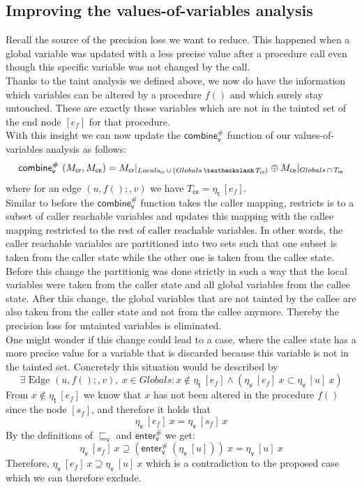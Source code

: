     \subsection{Improving the values-of-variables analysis}
    Recall the source of the precision loss we want to reduce. This happened when a global variable was updated with a less precise value after a procedure call even though this specific variable was not changed by the call.\\
    Thanks to the taint analysis we defined above, we now do have the information which variables can be altered by a procedure $f()$ and which surely stay untouched. These are exactly those variables which are not in the tainted set of the end node $[e_f]$ for that procedure.\\
    With this insight we can now update the $\textsf{combine}^{\#}_\textsf{v}$ function of our values-of-variables analysis as follows:
    \[
      \textsf{combine}^{\#}_\textsf{v}\ (M_\textsf{cr}, M_\textsf{ce}) = M_\textsf{cr}|_{Locals_\textsf{cr}\, \cup\, (Globals\, \textbackslash\, T_\textsf{ce})} \oplus M_\textsf{ce}|_{Globals\, \cap\, T_\textsf{ce}}
    \]
    where for an edge $(u, f();, v)$ we have $T_\textsf{ce} = \eta_\textsf{t}\ [e_f]$.\\
    Similar to before the $\textsf{combine}^{\#}_\textsf{v}$ function takes the caller mapping, restricts is to a subset of caller reachable variables and updates this mapping with the callee mapping restricted to the rest of caller reachable variables. In other words, the caller reachable variables are partitioned into two sets such that one subset is taken from the caller state while the other one is taken from the callee state. Before this change the partitionig was done strictly in such a way that the local variables were taken from the caller state and all global variables from the callee state. After this change, the global variables that are not tainted by the callee are also taken from the caller state and not from the callee anymore. Thereby the precision loss for untainted variables is eliminated.
    \\
    One might wonder if this change could lead to a case, where the callee state has a more precise value for a variable that is discarded because this variable is not in the tainted set. Concretely this situation would be described by 
    \[\exists \text{ Edge }(u, f();, v),\ x \in Globals: x \notin \eta_\textsf{t}\ [e_f] \land (\eta_\textsf{v}\ [e_f]\ x\subset \eta_\textsf{v}\ [u]\ x)\]
    From $x \notin \eta_\textsf{t}\ [e_f]$ we know that $x$ has not been altered in the procedure $f()$ since the node $[s_f]$, and therefore it holds that 
    \[\eta_\textsf{v}\ [e_f]\ x = \eta_\textsf{v}\ [s_f]\ x\]
    By the definitions of $\sqsubseteq_\textsf{v}$ and $\textsf{enter}^{\#}_\textsf{v}$ we get: 
    \[\eta_\textsf{v}\ [s_f]\ x \supseteq (\textsf{enter}^{\#}_\textsf{v}\ (\eta_\textsf{v}\ [u]))\ x = \eta_\textsf{v}\ [u]\ x\]
    Therefore, $\eta_\textsf{v}\ [e_f]\ x\supseteq \eta_\textsf{v}\ [u]\ x$ which is a contradiction to the proposed case which we can therefore exclude.

